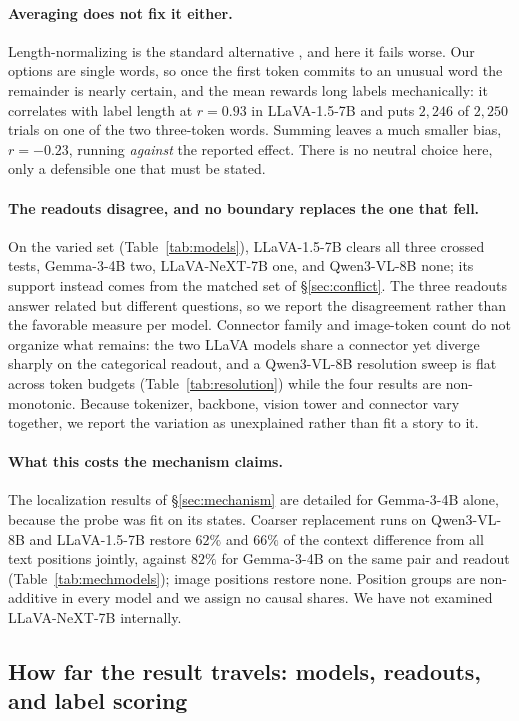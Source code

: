 \documentclass{article}
\newcommand{\gemma}{Gemma-3-4B}
\newcommand{\qwen}{Qwen3-VL-8B}
\newcommand{\llava}{LLaVA-1.5-7B}
\newcommand{\llavanext}{LLaVA-NeXT-7B}
\begin{document}
\paragraph{Averaging does not fix it either.}
Length-normalizing is the standard alternative \citep{brown2020}, and here it fails worse. Our options are single words, so once the first token commits to an unusual word the remainder is nearly certain, and the mean rewards long labels mechanically: it correlates with label length at $r=0.93$ in \llava{} and puts $2{,}246$ of $2{,}250$ trials on one of the two three-token words. Summing leaves a much smaller bias, $r=-0.23$, running \emph{against} the reported effect. There is no neutral choice here, only a defensible one that must be stated.

\paragraph{The readouts disagree, and no boundary replaces the one that fell.}
On the varied set (Table~\ref{tab:models}), \llava{} clears all three crossed tests, \gemma{} two, \llavanext{} one, and \qwen{} none; its support instead comes from the matched set of \S\ref{sec:conflict}. The three readouts answer related but different questions, so we report the disagreement rather than the favorable measure per model. Connector family and image-token count do not organize what remains: the two LLaVA models share a connector yet diverge sharply on the categorical readout, and a \qwen{} resolution sweep is flat across token budgets (Table~\ref{tab:resolution}) while the four results are non-monotonic. Because tokenizer, backbone, vision tower and connector vary together, we report the variation as unexplained rather than fit a story to it.

\paragraph{What this costs the mechanism claims.}
The localization results of \S\ref{sec:mechanism} are detailed for \gemma{} alone, because the probe was fit on its states. Coarser replacement runs on \qwen{} and \llava{} restore $62\%$ and $66\%$ of the context difference from all text positions jointly, against $82\%$ for \gemma{} on the same pair and readout (Table~\ref{tab:mechmodels}); image positions restore none. Position groups are non-additive in every model and we assign no causal shares. We have not examined \llavanext{} internally.
\else
\subsection{How far the result travels: models, readouts, and label scoring}
\label{sec:models}
\end{document}
